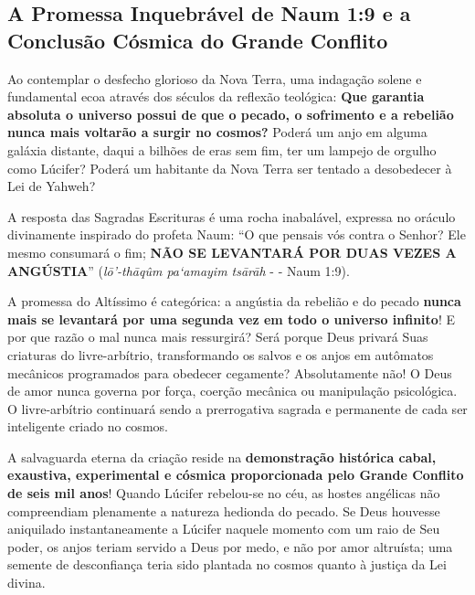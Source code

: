 \documentclass[11pt,a4paper,openany]{book}
\begin{document}
\subsection{A Promessa Inquebrável de Naum 1:9 e a Conclusão Cósmica do Grande Conflito}


Ao contemplar o desfecho glorioso da Nova Terra, uma indagação solene e fundamental ecoa através dos séculos da reflexão teológica:
\textbf{Que garantia absoluta o universo possui de que o pecado, o sofrimento e a rebelião nunca mais voltarão a surgir no cosmos?}
Poderá um anjo em alguma galáxia distante, daqui a bilhões de eras sem fim, ter um lampejo de orgulho como Lúcifer? Poderá um habitante da Nova Terra ser tentado a desobedecer à Lei de Yahweh?

A resposta das Sagradas Escrituras é uma rocha inabalável, expressa no oráculo divinamente inspirado do profeta Naum:
``O que pensais vós contra o Senhor? Ele mesmo consumará o fim; \textbf{NÃO SE LEVANTARÁ POR DUAS VEZES A ANGÚSTIA}'' (\textit{lō’-thāqûm pa‘amayim tsārāh} - - Naum 1:9).

A promessa do Altíssimo é categórica: a angústia da rebelião e do pecado \textbf{nunca mais se levantará por uma segunda vez em todo o universo infinito}!
E por que razão o mal nunca mais ressurgirá?
Será porque Deus privará Suas criaturas do livre-arbítrio, transformando os salvos e os anjos em autômatos mecânicos programados para obedecer cegamente?
Absolutamente não! O Deus de amor nunca governa por força, coerção mecânica ou manipulação psicológica. O livre-arbítrio continuará sendo a prerrogativa sagrada e permanente de cada ser inteligente criado no cosmos.

A salvaguarda eterna da criação reside na \textbf{demonstração histórica cabal, exaustiva, experimental e cósmica proporcionada pelo Grande Conflito de seis mil anos}!
Quando Lúcifer rebelou-se no céu, as hostes angélicas não compreendiam plenamente a natureza hedionda do pecado. Se Deus houvesse aniquilado instantaneamente a Lúcifer naquele momento com um raio de Seu poder, os anjos teriam servido a Deus por medo, e não por amor altruísta; uma semente de desconfiança teria sido plantada no cosmos quanto à justiça da Lei divina.
\end{document}
